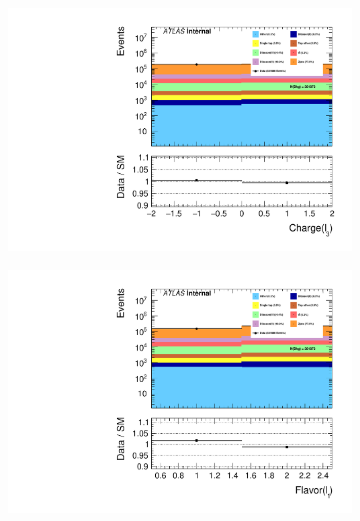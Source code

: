 \begin{figure}
{\begin{subfigure}{.425\textwidth}
        \includegraphics[width=\textwidth]{Figures/FeaturesHistograms/lep3_Charge.pdf}
        \caption{}
        \label{fig:lep3_Charge}
    \end{subfigure}
    \hfill
    \begin{subfigure}{.425\textwidth}
        \includegraphics[width=\textwidth]{Figures/FeaturesHistograms/lep1_Flavor.pdf}
        \caption{}
        \label{fig:lep1_Flavor}
    \end{subfigure}
    }
\end{figure}
